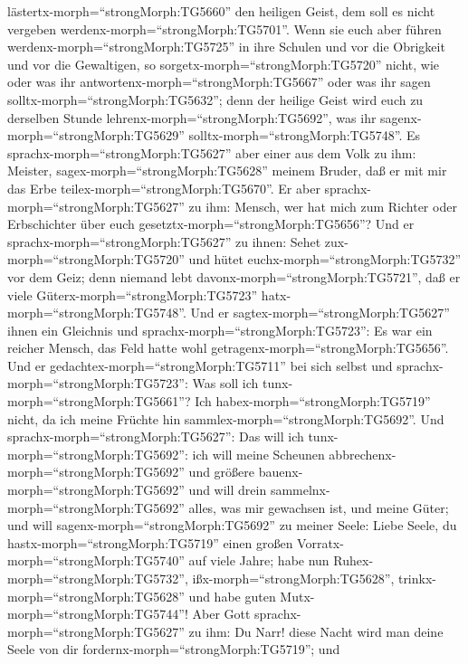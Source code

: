 lästertx-morph=``strongMorph:TG5660'' den heiligen Geist, dem soll es
nicht vergeben werdenx-morph=``strongMorph:TG5701''.  Wenn
sie euch aber führen werdenx-morph=``strongMorph:TG5725'' in ihre
Schulen und vor die Obrigkeit und vor die Gewaltigen, so
sorgetx-morph=``strongMorph:TG5720'' nicht, wie oder was ihr
antwortenx-morph=``strongMorph:TG5667'' oder was ihr sagen
solltx-morph=``strongMorph:TG5632'';  denn der heilige
Geist wird euch zu derselben Stunde
lehrenx-morph=``strongMorph:TG5692'', was ihr
sagenx-morph=``strongMorph:TG5629'' solltx-morph=``strongMorph:TG5748''.
 Es sprachx-morph=``strongMorph:TG5627'' aber einer aus dem
Volk zu ihm: Meister, sagex-morph=``strongMorph:TG5628'' meinem Bruder,
daß er mit mir das Erbe teilex-morph=``strongMorph:TG5670''.
 Er aber sprachx-morph=``strongMorph:TG5627'' zu ihm:
Mensch, wer hat mich zum Richter oder Erbschichter über euch
gesetztx-morph=``strongMorph:TG5656''?  Und er
sprachx-morph=``strongMorph:TG5627'' zu ihnen: Sehet
zux-morph=``strongMorph:TG5720'' und hütet
euchx-morph=``strongMorph:TG5732'' vor dem Geiz; denn niemand lebt
davonx-morph=``strongMorph:TG5721'', daß er viele
Güterx-morph=``strongMorph:TG5723'' hatx-morph=``strongMorph:TG5748''.
 Und er sagtex-morph=``strongMorph:TG5627'' ihnen ein
Gleichnis und sprachx-morph=``strongMorph:TG5723'': Es war ein reicher
Mensch, das Feld hatte wohl getragenx-morph=``strongMorph:TG5656''.
 Und er gedachtex-morph=``strongMorph:TG5711'' bei sich
selbst und sprachx-morph=``strongMorph:TG5723'': Was soll ich
tunx-morph=``strongMorph:TG5661''? Ich
habex-morph=``strongMorph:TG5719'' nicht, da ich meine Früchte hin
sammlex-morph=``strongMorph:TG5692''.  Und
sprachx-morph=``strongMorph:TG5627'': Das will ich
tunx-morph=``strongMorph:TG5692'': ich will meine Scheunen
abbrechenx-morph=``strongMorph:TG5692'' und größere
bauenx-morph=``strongMorph:TG5692'' und will drein
sammelnx-morph=``strongMorph:TG5692'' alles, was mir gewachsen ist, und
meine Güter;  und will sagenx-morph=``strongMorph:TG5692''
zu meiner Seele: Liebe Seele, du hastx-morph=``strongMorph:TG5719''
einen großen Vorratx-morph=``strongMorph:TG5740'' auf viele Jahre; habe
nun Ruhex-morph=``strongMorph:TG5732'',
ißx-morph=``strongMorph:TG5628'', trinkx-morph=``strongMorph:TG5628''
und habe guten Mutx-morph=``strongMorph:TG5744''!  Aber
Gott sprachx-morph=``strongMorph:TG5627'' zu ihm: Du Narr! diese Nacht
wird man deine Seele von dir fordernx-morph=``strongMorph:TG5719''; und

